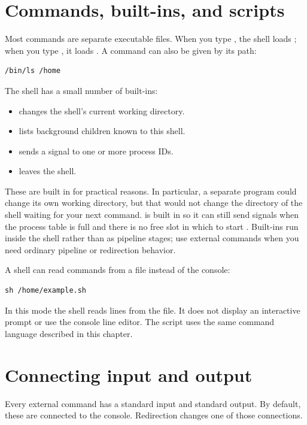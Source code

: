 \section{Commands, built-ins, and scripts}

Most commands are separate executable files. When you type , the shell loads ; when you type , it loads . A command can also be given by its path:

\begin{lstlisting}
/bin/ls /home
\end{lstlisting}

The shell has a small number of built-ins:

\begin{itemize}
  \item {} changes the shell's current working directory.
  \item {} lists background children known to this shell.
  \item {} sends a signal to one or more process IDs.
  \item {} leaves the shell.
\end{itemize}

These are built in for practical reasons. In particular, a separate  program could change its own working directory, but that would not change the directory of the shell waiting for your next command.  is built in so it can still send signals when the process table is full and there is no free slot in which to start . Built-ins run inside the shell rather than as pipeline stages; use external commands when you need ordinary pipeline or redirection behavior.

A shell can read commands from a file instead of the console:

\begin{lstlisting}
sh /home/example.sh
\end{lstlisting}

In this mode the shell reads lines from the file. It does not display an interactive prompt or use the console line editor. The script uses the same command language described in this chapter.

\section{Connecting input and output}

Every external command has a standard input and standard output. By default, these are connected to the console. Redirection changes one of those connections.

